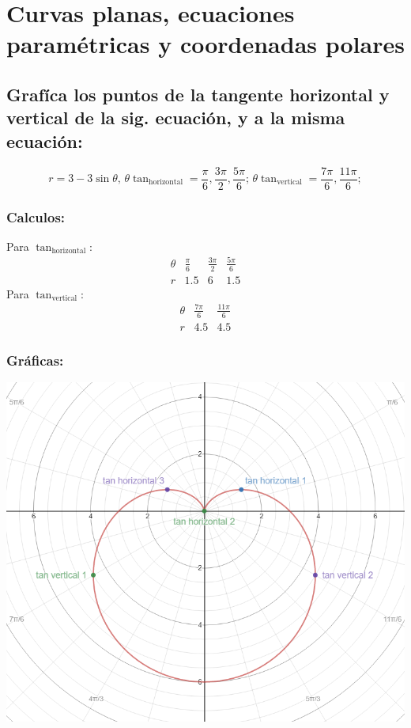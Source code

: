 \documentclass[letterpaper, 12pt]{article}
\begin{document}
\setcounter{page}{1}
\thispagestyle{fancy}
\section*{Curvas planas, ecuaciones paramétricas y coordenadas polares}
\subsection*{Grafíca los puntos de la tangente horizontal y vertical de la sig. ecuación, y a la misma ecuación: }
\[r=3-3\sin\theta,\, \theta\tan_{\text{horizontal}}=\frac{\pi}{6},\frac{3\pi}{2}, \frac{5\pi}{6};\,\theta\tan_{\text{vertical}}=\frac{7\pi}{6},\frac{11\pi}{6};\]
\subsubsection*{Calculos: }
Para \(\tan_{\text{horizontal}}\):
\[\begin{matrix}
    \theta&\frac{\pi}{6}&\frac{3\pi}{2}&\frac{5\pi}{6}\\
    r&1.5&6&1.5
\end{matrix}\]
Para \(\tan_{\text{vertical}}\):
\[\begin{matrix}
    \theta&\frac{7\pi}{6}&\frac{11\pi}{6}\\
    r&4.5&4.5
\end{matrix}\]
\subsubsection*{Gráficas:}
\begin{center}
    \includegraphics{Capture.png}
\end{center}
\end{document}
